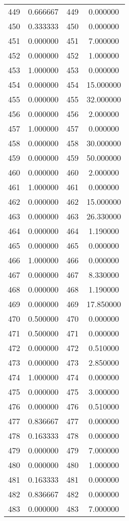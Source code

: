 \documentclass[12pt]{article}
\begin{document}
\begin{longtable}{@{}cccc@{}}
449 & 0.666667 & 449 & 0.000000 \\
450 & 0.333333 & 450 & 0.000000 \\
451 & 0.000000 & 451 & 7.000000 \\
452 & 0.000000 & 452 & 1.000000 \\
453 & 1.000000 & 453 & 0.000000 \\
454 & 0.000000 & 454 & 15.000000 \\
455 & 0.000000 & 455 & 32.000000 \\
456 & 0.000000 & 456 & 2.000000 \\
457 & 1.000000 & 457 & 0.000000 \\
458 & 0.000000 & 458 & 30.000000 \\
459 & 0.000000 & 459 & 50.000000 \\
460 & 0.000000 & 460 & 2.000000 \\
461 & 1.000000 & 461 & 0.000000 \\
462 & 0.000000 & 462 & 15.000000 \\
463 & 0.000000 & 463 & 26.330000 \\
464 & 0.000000 & 464 & 1.190000 \\
465 & 0.000000 & 465 & 0.000000 \\
466 & 1.000000 & 466 & 0.000000 \\
467 & 0.000000 & 467 & 8.330000 \\
468 & 0.000000 & 468 & 1.190000 \\
469 & 0.000000 & 469 & 17.850000 \\
470 & 0.500000 & 470 & 0.000000 \\
471 & 0.500000 & 471 & 0.000000 \\
472 & 0.000000 & 472 & 0.510000 \\
473 & 0.000000 & 473 & 2.850000 \\
474 & 1.000000 & 474 & 0.000000 \\
475 & 0.000000 & 475 & 3.000000 \\
476 & 0.000000 & 476 & 0.510000 \\
477 & 0.836667 & 477 & 0.000000 \\
478 & 0.163333 & 478 & 0.000000 \\
479 & 0.000000 & 479 & 7.000000 \\
480 & 0.000000 & 480 & 1.000000 \\
481 & 0.163333 & 481 & 0.000000 \\
482 & 0.836667 & 482 & 0.000000 \\
483 & 0.000000 & 483 & 7.000000 \\

\end{longtable}
\end{document}
